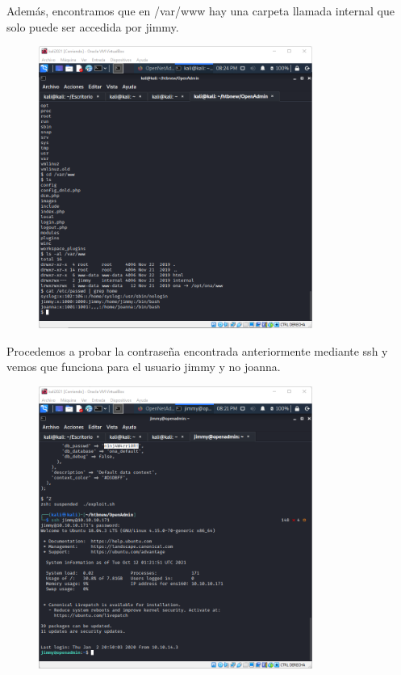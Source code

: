 \documentclass{article}
\begin{document}
Además, encontramos que en /var/www hay una carpeta llamada internal que solo puede ser accedida por jimmy.
\begin{figure}[h]
	\center
	\includegraphics[width=0.8\textwidth]{images/openadmin/9-usuariosycarpetas.png}
	\caption{}
\end{figure}

Procedemos a probar la contraseña encontrada anteriormente mediante ssh y vemos que funciona para el usuario jimmy y no joanna.
\begin{figure}[h]
	\center
	\includegraphics[width=0.8\textwidth]{images/openadmin/10-sshjimmy.png}
	\caption{}
\end{figure}
\end{document}
